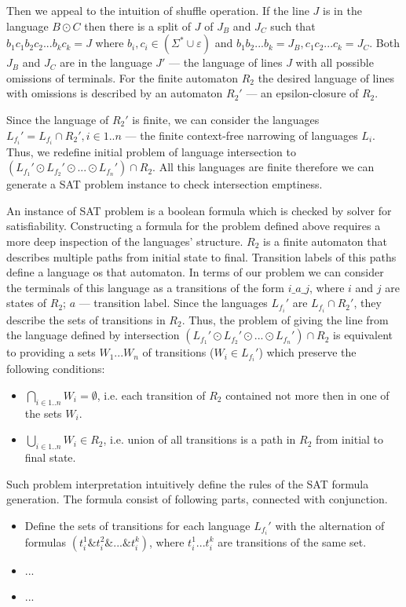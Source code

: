 Then we appeal to the intuition of shuffle operation. If the line $J$ is in the language $B \odot C$ then there is 
a split of $J$ of $J_B$ and $J_C$ such that $b_1 c_1 b_2 c_2 ... b_k c_k = J$ where $b_i, c_i \in (\Sigma^* \cup \varepsilon)$
and $b_1 b_2 ... b_k = J_B, c_1 c_2 ... c_k = J_C$. Both $J_B$ and $J_C$ are in the language $J'$ ---
the language of lines $J$ with all possible omissions of terminals.
For the finite automaton $R_2$ the desired language of lines with omissions is described by an automaton $R_2'$ ---  
an epsilon-closure of $ R_2 $.

Since the language of $R_2'$ is finite, we can consider the languages
$ L_{f_i}' = L_{f_i} \cap R_2', i \in 1..n$ --- the finite context-free narrowing of languages $ L_{i}$.
Thus, we redefine initial problem of language intersection to $(L_{f_1}' \odot L_{f_2}' \odot... \odot L_{f_n}')\cap R_2$.
All this languages are finite therefore we can generate a SAT problem instance to check intersection emptiness.

An instance of SAT problem is a boolean formula which is checked by solver for satisfiability. 
Constructing a formula for the problem defined above requires a more deep inspection of the languages' structure.
$R_2$ is a finite automaton that describes multiple paths from initial state to final. Transition labels of 
this paths define a language os that automaton. In terms of our problem we can consider the terminals of this language as 
a transitions of the form $i\_a\_j$, where $i$ and $j$ are states of $R_2$; $a$ --- transition label.
Since the languages $L_{f_i}'$ are $L_{f_i} \cap R_2'$, they describe the sets of transitions in 
$R_2$. Thus, the problem of giving the line from the language defined by intersection $(L_{f_1}' \odot L_{f_2}' \odot... \odot L_{f_n}')\cap R_2$
is equivalent to providing a sets $W_1...W_n$ of transitions ($W_i \in L_{f_i}'$) which preserve the following conditions:
\begin{itemize}
	\item $\bigcap\limits_{i\in 1..n} W_i = \emptyset$, i.e.
	each transition of $R_2$ contained not more then in one of the sets $W_i$.
	\item $\bigcup\limits_{i\in 1..n} W_i \in R_2$, i.e. union of all transitions
	is a path in $R_2$ from initial to final state. 
\end{itemize}
Such problem interpretation intuitively define the rules of the SAT formula generation.
The formula consist of following parts, connected with conjunction.
\begin{itemize}
	\item Define the sets of transitions for each language $L_{f_i}'$ with the alternation
	 of formulas $(t_i^1 \& t_i^2 \& ...\& t_i^k)$, where $t_i^1 ... t_i^k$ are transitions of the same set.
	\item ...
	\item ...
\end{itemize}





